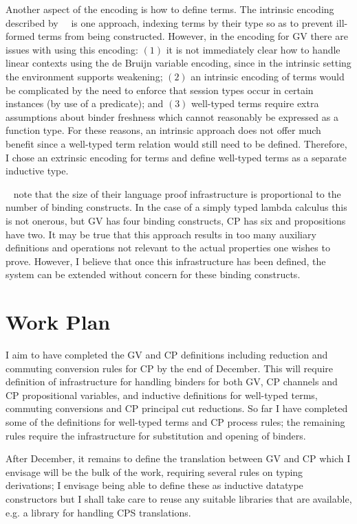\documentclass{mprop}
\newcommand{\1}{\textbf{1}\xspace}
\begin{document}
Another aspect of the encoding is how to define terms. The intrinsic encoding described by~\citeauthor{Benton:2012:STT}~\cite{Benton:2012:STT} is one approach, indexing terms by their type so as to prevent ill-formed terms from being constructed. However, in the encoding for GV there are issues with using this encoding: $(1)$ it is not immediately clear how to handle linear contexts using the de Bruijn variable encoding, since in the intrinsic setting the environment supports weakening; $(2)$ an intrinsic encoding of terms would be complicated by the need to enforce that session types occur in certain instances (by use of a predicate); and $(3)$ well-typed terms require extra assumptions about binder freshness which cannot reasonably be expressed as a function type. For these reasons, an intrinsic approach does not offer much benefit since a well-typed term relation would still need to be defined. Therefore, I chose an extrinsic encoding for terms and define well-typed terms as a separate inductive type.

\citeauthor{Aydemir:2008:EFM}~\cite{Aydemir:2008:EFM} note that the size of their language proof infrastructure is proportional to the number of binding constructs. In the case of a simply typed lambda calculus this is not onerous, but GV has four binding constructs, CP has six and propositions have two. It may be true that this approach results in too many auxiliary definitions and operations not relevant to the actual properties one wishes to prove. However, I believe that once this infrastructure has been defined, the system can be extended without concern for these binding constructs.

\section{Work Plan}

I aim to have completed the GV and CP definitions including reduction and commuting conversion rules for CP by the end of December. This will require definition of infrastructure for handling binders for both GV, CP channels and CP propositional variables, and inductive definitions for well-typed terms, commuting conversions and CP principal cut reductions. So far I have completed some of the definitions for well-typed terms and CP process rules; the remaining rules require the infrastructure for substitution and opening of binders.

After December, it remains to define the translation between GV and CP which I envisage will be the bulk of the work, requiring several rules on typing derivations; I envisage being able to define these as inductive datatype constructors but I shall take care to reuse any suitable libraries that are available, e.g. a library for handling CPS translations.
\end{document}
